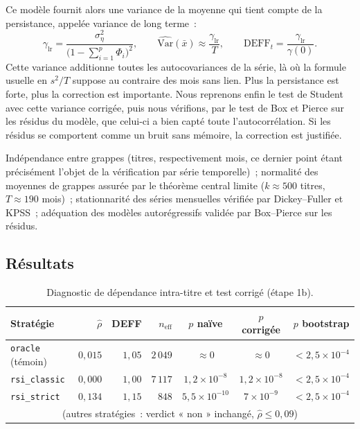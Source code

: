 Ce modèle fournit alors une variance de la moyenne qui tient compte de
la persistance, appelée variance de long terme~:
\[
  \gamma_{\mathrm{lr}}
     = \frac{\sigma^2_\eta}{\bigl(1-\sum_{i=1}^{p}\Phi_i\bigr)^{2}},
  \qquad
  \widehat{\mathrm{Var}}(\bar x) \approx \frac{\gamma_{\mathrm{lr}}}{T},
  \qquad
  \mathrm{DEFF}_t = \frac{\gamma_{\mathrm{lr}}}{\gamma(0)} .
\]
Cette variance additionne toutes les autocovariances de la série, là où
la formule usuelle en $s^2/T$ suppose au contraire des mois sans lien.
Plus la persistance est forte, plus la correction est importante. Nous
reprenons enfin le test de Student avec cette variance corrigée, puis
nous vérifions, par le test de Box et Pierce sur les résidus du modèle,
que celui-ci a bien capté toute l'autocorrélation. Si les résidus se
comportent comme un bruit sans mémoire, la correction est justifiée.

\begin{conditions}
Indépendance entre grappes (titres, respectivement mois, ce dernier
point étant précisément l'objet de la vérification par série
temporelle)~; normalité des moyennes de grappes assurée par le théorème
central limite ($k \approx 500$ titres, $T \approx 190$ mois)~;
stationnarité des séries mensuelles vérifiée par Dickey--Fuller et
KPSS~; adéquation des modèles autorégressifs validée par Box--Pierce sur
les résidus.
\end{conditions}

\subsection{Résultats}

\begin{table}[H]
\centering
\caption{Diagnostic de dépendance intra-titre et test corrigé (étape 1b).}
\label{tab:b1-dep-deff}
\small
\begin{tabular}{@{}lrrrccc@{}}
\toprule
Stratégie & $\hat\rho$ & DEFF & $n_{\text{eff}}$ & $p$ naïve & $p$ corrigée & $p$ bootstrap \\
\midrule
\texttt{oracle} (témoin) & $0{,}015$ & $1{,}05$ & $2\,049$ & $\approx 0$ & $\approx 0$ & $<2{,}5\times10^{-4}$ \\
\midrule
\texttt{rsi\_classic} & $0{,}000$ & $1{,}00$ & $7\,117$ & $1{,}2\times10^{-8}$ & $1{,}2\times10^{-8}$ & $<2{,}5\times10^{-4}$ \\
\texttt{rsi\_strict}  & $0{,}134$ & $1{,}15$ & $848$    & $5{,}5\times10^{-10}$ & $7\times10^{-9}$     & $<2{,}5\times10^{-4}$ \\
\multicolumn{7}{c}{\footnotesize (autres stratégies~: verdict « non » inchangé, $\hat\rho \le 0{,}09$)} \\
\bottomrule
\end{tabular}
\end{table}

